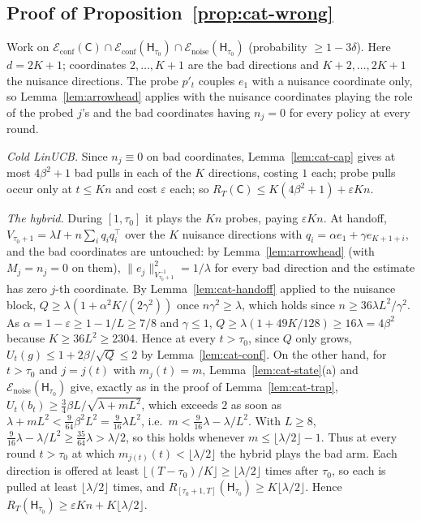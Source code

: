 \documentclass{article}
\theoremstyle{definition}
\theoremstyle{remark}
\newcommand{\eps}{\varepsilon}
\theoremstyle{remark}
\newcommand{\Cold}{\mathsf{C}}
\newcommand{\Hyb}{\mathsf{H}}
\begin{document}
\subsection{Proof of Proposition~\ref{prop:cat-wrong}}

Work on $\mathcal E_{\mathrm{conf}}(\Cold)\cap\mathcal E_{\mathrm{conf}}(\Hyb_{\tau_0})\cap\mathcal E_{\mathrm{noise}}(\Hyb_{\tau_0})$
(probability $\ge1-3\delta$). Here $d=2K+1$; coordinates $2,\dots,K+1$ are the
bad directions and $K+2,\dots,2K+1$ the nuisance directions. The probe $p'_t$
couples $e_1$ with a nuisance coordinate only, so Lemma~\ref{lem:arrowhead}
applies with the nuisance coordinates playing the role of the probed $j$'s
and the bad coordinates having $n_j=0$ for every policy at every round.

\emph{Cold LinUCB.} Since $n_j\equiv0$ on bad coordinates,
Lemma~\ref{lem:cat-cap} gives at most $4\beta^2+1$ bad pulls in each of the $K$
directions, costing $1$ each; probe pulls occur only at $t\le Kn$ and cost
$\eps$ each; so $R_T(\Cold)\le K(4\beta^2+1)+\eps Kn$.

\emph{The hybrid.} During $[1,\tau_0]$ it plays the $Kn$ probes, paying $\eps Kn$.
At handoff, $V_{\tau_0+1}=\lambda I+n\sum_{i}q_iq_i^\top$ over the $K$ nuisance
directions with $q_i=\alpha e_1+\gamma e_{K+1+i}$, and the bad coordinates are
untouched: by Lemma~\ref{lem:arrowhead} (with $M_j=n_j=0$ on them),
$\|e_j\|^2_{V_{\tau_0+1}^{-1}}=1/\lambda$ for every bad direction and the estimate
has zero $j$-th coordinate. By Lemma~\ref{lem:cat-handoff} applied to the
nuisance block, $Q\ge\lambda(1+\alpha^2K/(2\gamma^2))$ once $n\gamma^2\ge\lambda$, which holds
since $n\ge36\lambda L^2/\gamma^2$. As $\alpha=1-\eps\ge1-1/L\ge7/8$ and $\gamma\le1$,
$Q\ge\lambda(1+49K/128)\ge16\lambda=4\beta^2$ because $K\ge36L^2\ge2304$. Hence at
every $t>\tau_0$, since $Q$ only grows, $U_t(g)\le1+2\beta/\sqrt Q\le2$ by
Lemma~\ref{lem:cat-conf}. On the other hand, for $t>\tau_0$ and $j=j(t)$ with
$m_j(t)=m$, Lemma~\ref{lem:cat-state}(a) and $\mathcal E_{\mathrm{noise}}(\Hyb_{\tau_0})$
give, exactly as in the proof of Lemma~\ref{lem:cat-trap},
$U_t(b_t)\ge\tfrac34\beta L/\sqrt{\lambda+mL^2}$, which exceeds $2$ as soon as
$\lambda+mL^2<\tfrac9{64}\beta^2L^2=\tfrac9{16}\lambda L^2$, i.e.\ $m<\tfrac9{16}\lambda-\lambda/L^2$.
With $L\ge8$, $\tfrac9{16}\lambda-\lambda/L^2\ge\tfrac{35}{64}\lambda>\lambda/2$, so this holds
whenever $m\le\lfloor\lambda/2\rfloor-1$. Thus at every round $t>\tau_0$ at which
$m_{j(t)}(t)<\lfloor\lambda/2\rfloor$ the hybrid plays the bad arm. Each direction
is offered at least $\lfloor(T-\tau_0)/K\rfloor\ge\lfloor\lambda/2\rfloor$ times after
$\tau_0$, so each is pulled at least $\lfloor\lambda/2\rfloor$ times, and
$R_{[\tau_0+1,T]}(\Hyb_{\tau_0})\ge K\lfloor\lambda/2\rfloor$. Hence
$R_T(\Hyb_{\tau_0})\ge\eps Kn+K\lfloor\lambda/2\rfloor$.
\end{document}
